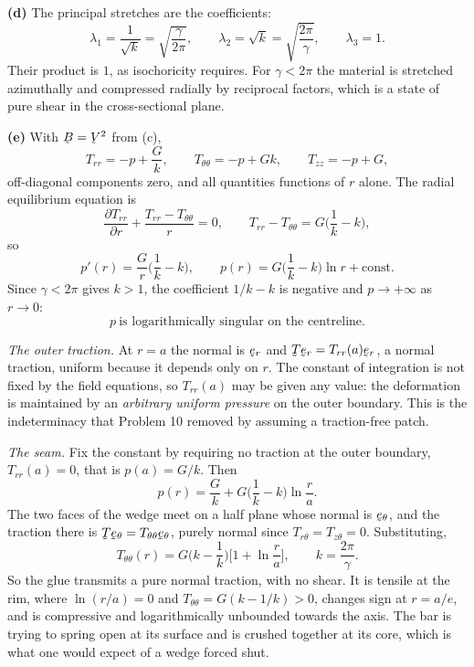 \begin{solution}
\textbf{(d)} The principal stretches are the coefficients:
\[
   \boxed{\;\lambda_{1}=\frac{1}{\sqrt k}=\sqrt{\frac{\gamma}{2\pi}},
   \qquad \lambda_{2}=\sqrt k=\sqrt{\frac{2\pi}{\gamma}},
   \qquad\lambda_{3}=1 .\;}
\]
Their product is $1$, as isochoricity requires. For $\gamma<2\pi$ the
material is stretched azimuthally and compressed radially by reciprocal
factors, which is a state of pure shear in the cross-sectional plane.

\textbf{(e)} With $\bB=\bV^{2}$ from (c),
\[
   T_{rr}=-p+\frac{G}{k},\qquad T_{\theta\theta}=-p+Gk,
   \qquad T_{zz}=-p+G ,
\]
off-diagonal components zero, and all quantities functions of $r$ alone.
The radial equilibrium equation is
\[
   \frac{\partial T_{rr}}{\partial r}
   +\frac{T_{rr}-T_{\theta\theta}}{r}=0,
   \qquad T_{rr}-T_{\theta\theta}=G\Big(\frac1k-k\Big),
\]
so
\[
   p'(r)=\frac{G}{r}\Big(\frac1k-k\Big),
   \qquad
   p(r)=G\Big(\frac1k-k\Big)\ln r+\text{const}.
\]
Since $\gamma<2\pi$ gives $k>1$, the coefficient $1/k-k$ is negative and
$p\to+\infty$ as $r\to0$:
\[
   \boxed{\;p\ \text{is logarithmically singular on the centreline.}\;}
\]

\emph{The outer traction.} At $r=a$ the normal is $\ber$ and
$\bT\ber=T_{rr}(a)\ber$, a normal traction, uniform because it depends
only on $r$. The constant of integration is not fixed by the field
equations, so $T_{rr}(a)$ may be given any value: the deformation is
maintained by an \emph{arbitrary uniform pressure} on the outer
boundary. This is the indeterminacy that Problem 10 removed by assuming
a traction-free patch.

\emph{The seam.} Fix the constant by requiring no traction at the outer
boundary, $T_{rr}(a)=0$, that is $p(a)=G/k$. Then
\[
   p(r)=\frac{G}{k}+G\Big(\frac1k-k\Big)\ln\frac{r}{a} .
\]
The two faces of the wedge meet on a half plane whose normal is $\bet$,
and the traction there is $\bT\bet=T_{\theta\theta}\bet$, purely normal
since $T_{r\theta}=T_{z\theta}=0$. Substituting,
\[
   \boxed{\;T_{\theta\theta}(r)
   =G\Big(k-\frac1k\Big)\Big[1+\ln\frac{r}{a}\Big],
   \qquad k=\frac{2\pi}{\gamma} .\;}
\]
So the glue transmits a pure normal traction, with no shear. It is
tensile at the rim, where $\ln(r/a)=0$ and $T_{\theta\theta}
=G(k-1/k)>0$, changes sign at $r=a/e$, and is compressive and
logarithmically unbounded towards the axis. The bar is trying to spring
open at its surface and is crushed together at its core, which is what
one would expect of a wedge forced shut.
\end{solution}

